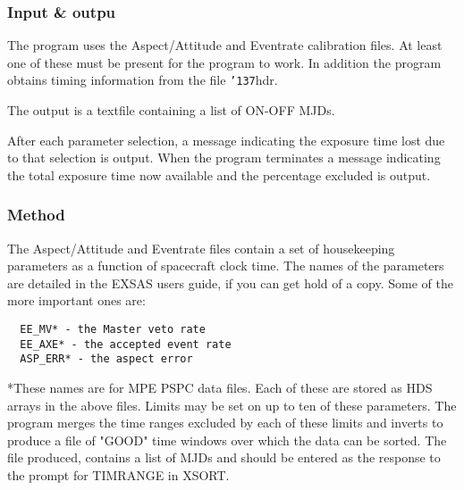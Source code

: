 \documentclass{book}
\renewcommand{\_}{{\tt\char'137}}     %
\begin{document}
\subsubsection{Input \& outpu}
The program uses the Aspect/Attitude and Eventrate calibration files.
At least one of these must be present for the program to work.
In addition the program obtains timing information from the file
\_hdr.

The output is a textfile containing a list of ON-OFF MJDs.

After each parameter selection, a message indicating the exposure
time lost due to that selection is output. When the program terminates
a message indicating the total exposure time now available and the
percentage excluded is output.

\subsubsection{Method}
The Aspect/Attitude and Eventrate files contain a set of
housekeeping parameters as a function of spacecraft clock time.
The names of the parameters are detailed in the EXSAS users guide,
if you can get hold of a copy. Some of the more important
ones are:
\begin{verbatim}
  EE_MV* - the Master veto rate
  EE_AXE* - the accepted event rate
  ASP_ERR* - the aspect error
\end{verbatim}
*These names are for MPE PSPC data files.
Each of these are stored as HDS arrays in the above files.
Limits may be set on up to ten of these parameters. The program
merges the time ranges excluded by each of these limits and
inverts to produce a file of "GOOD" time windows over which the
data can be sorted. The file produced, contains a list of MJDs and
should be entered as the response to the prompt for TIMRANGE in
XSORT.
\end{document}
